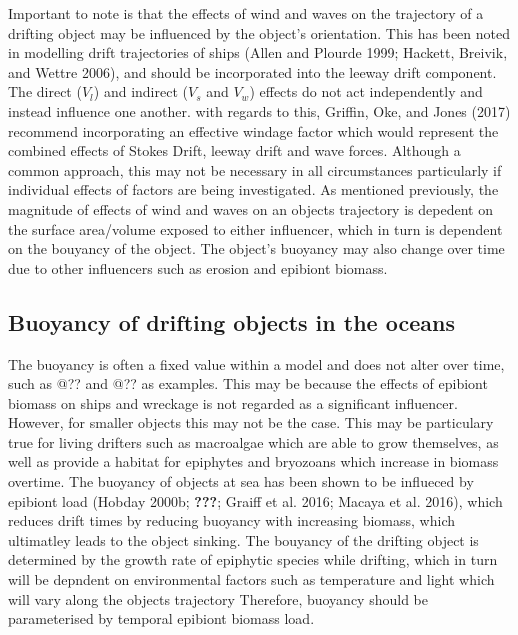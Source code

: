 \documentclass[
]{article}
\begin{document}
Important to note is that the effects of wind and waves on the
trajectory of a drifting object may be influenced by the object's
orientation. This has been noted in modelling drift trajectories of
ships (Allen and Plourde 1999; Hackett, Breivik, and Wettre 2006), and
should be incorporated into the leeway drift component. The direct
(\(V_l\)) and indirect (\(V_s\) and \(V_w\)) effects do not act
independently and instead influence one another. with regards to this,
Griffin, Oke, and Jones (2017) recommend incorporating an effective
windage factor which would represent the combined effects of Stokes
Drift, leeway drift and wave forces. Although a common approach, this
may not be necessary in all circumstances particularly if individual
effects of factors are being investigated. As mentioned previously, the
magnitude of effects of wind and waves on an objects trajectory is
depedent on the surface area/volume exposed to either influencer, which
in turn is dependent on the bouyancy of the object. The object's
buoyancy may also change over time due to other influencers such as
erosion and epibiont biomass.

\hypertarget{buoyancy-of-drifting-objects-in-the-oceans}{%
\subsection{Buoyancy of drifting objects in the
oceans}\label{buoyancy-of-drifting-objects-in-the-oceans}}

The buoyancy is often a fixed value within a model and does not alter
over time, such as @?? and @?? as examples. This may be because the
effects of epibiont biomass on ships and wreckage is not regarded as a
significant influencer. However, for smaller objects this may not be the
case. This may be particulary true for living drifters such as
macroalgae which are able to grow themselves, as well as provide a
habitat for epiphytes and bryozoans which increase in biomass overtime.
The buoyancy of objects at sea has been shown to be influeced by
epibiont load (Hobday 2000b; {\textbf{???}}; Graiff et al. 2016; Macaya
et al. 2016), which reduces drift times by reducing buoyancy with
increasing biomass, which ultimatley leads to the object sinking. The
bouyancy of the drifting object is determined by the growth rate of
epiphytic species while drifting, which in turn will be depndent on
environmental factors such as temperature and light which will vary
along the objects trajectory Therefore, buoyancy should be parameterised
by temporal epibiont biomass load.
\end{document}
